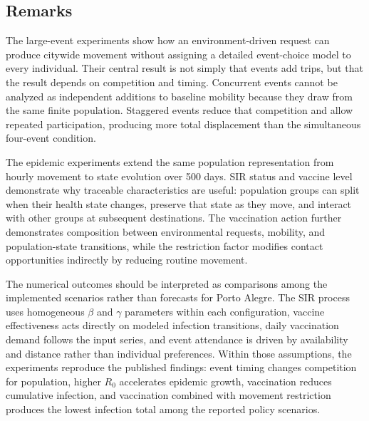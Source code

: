 \subsection{Remarks}

The large-event experiments show how an environment-driven request can produce citywide movement without assigning a detailed event-choice model to every individual. Their central result is not simply that events add trips, but that the result depends on competition and timing. Concurrent events cannot be analyzed as independent additions to baseline mobility because they draw from the same finite population. Staggered events reduce that competition and allow repeated participation, producing more total displacement than the simultaneous four-event condition.

The epidemic experiments extend the same population representation from hourly movement to state evolution over 500 days. SIR status and vaccine level demonstrate why traceable characteristics are useful: population groups can split when their health state changes, preserve that state as they move, and interact with other groups at subsequent destinations. The vaccination action further demonstrates composition between environmental requests, mobility, and population-state transitions, while the restriction factor modifies contact opportunities indirectly by reducing routine movement.

The numerical outcomes should be interpreted as comparisons among the implemented scenarios rather than forecasts for Porto Alegre. The SIR process uses homogeneous $\beta$ and $\gamma$ parameters within each configuration, vaccine effectiveness acts directly on modeled infection transitions, daily vaccination demand follows the input series, and event attendance is driven by availability and distance rather than individual preferences. Within those assumptions, the experiments reproduce the published findings: event timing changes competition for population, higher $R_0$ accelerates epidemic growth, vaccination reduces cumulative infection, and vaccination combined with movement restriction produces the lowest infection total among the reported policy scenarios.
